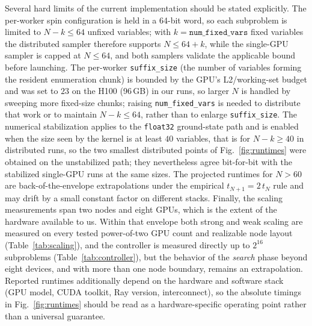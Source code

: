 \documentclass[12pt,a4paper]{elsarticle}
\begin{document}
Several hard limits of the current implementation should be stated explicitly.
The per-worker spin configuration is held in a 64-bit
word, so each subproblem is limited to $N-k \leq 64$ unfixed variables; with
$k=\texttt{num\_fixed\_vars}$ fixed variables the distributed sampler therefore
supports $N \leq 64+k$, while the single-GPU sampler is capped at $N \leq 64$,
and both samplers validate the applicable bound before launching. The
per-worker \texttt{suffix\_size} (the number of
variables forming the resident enumeration chunk) is bounded by the GPU's
L2/working-set budget and was set to $23$ on the H100 (96\,GB) in our runs, so
larger $N$ is handled by sweeping more fixed-size chunks; raising
\texttt{num\_fixed\_vars} is needed to distribute that work or to maintain
$N-k\leq64$, rather than to enlarge \texttt{suffix\_size}. The numerical
stabilization applies to the
\texttt{float32} ground-state path and is enabled when the size seen by the
kernel is at least $40$ variables, that is for $N-k \geq 40$ in distributed
runs, so the two smallest distributed points of Fig.~\ref{fig:runtimes} were
obtained on the unstabilized path; they nevertheless agree bit-for-bit with the
stabilized single-GPU runs at the same sizes. The projected runtimes
for $N > 60$ are back-of-the-envelope extrapolations under the empirical
$t_{N+1}=2\,t_N$ rule and may drift by a small constant factor on different
stacks. Finally, the scaling measurements span two nodes and eight GPUs, which is
the extent of the hardware available to us. Within that envelope both strong and
weak scaling are measured on every tested power-of-two GPU count and realizable node layout
(Table~\ref{tab:scaling}), and the controller is measured directly up to $2^{16}$
subproblems (Table~\ref{tab:controller}), but the behavior of the \emph{search}
phase beyond eight devices, and with more than one node boundary, remains an
extrapolation. Reported runtimes
additionally depend on the hardware and software stack (GPU model, CUDA
toolkit, Ray version, interconnect), so the absolute timings in
Fig.~\ref{fig:runtimes} should be read as a hardware-specific operating
point rather than a universal guarantee.
\end{document}
